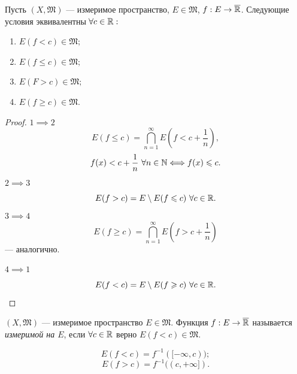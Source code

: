\begin{lemma}
    Пусть $(X, \mathfrak{M})$ — измеримое пространство, $E \in \mathfrak{M}$, $f: E \to \overline{\mathbb{R}}$.
    Следующие условия эквивалентны $\forall c \in \mathbb{R}:$
    \begin{enumerate}
        \item $E(f < c) \in \mathfrak{M};$
        \item $E(f \leqslant c) \in \mathfrak{M};$
        \item $E(F > c) \in \mathfrak{M};$
        \item $E(f \geqslant c) \in \mathfrak{M}.$
    \end{enumerate}
\end{lemma} 
\begin{proof}\tab

    \noindent\underline{$1 \implies 2$}
    \[E(f \leqslant c) = \bigcap\limits_{n=1}^{\infty} E\left(f < c + \frac{1}{n}\right),\]
    \[f(x) < c + \frac{1}{n} \ \forall n \in \mathbb{N} \Longleftrightarrow f(x) \leqslant c.\]
    \underline{$2 \implies 3$}
    \[E(f > c) = E \setminus E(f \leqslant c) \ \forall c \in \mathbb{R}.\]
    \underline{$3 \implies 4$}
    \[E(f \geqslant c) = \bigcap\limits_{n=1}^{\infty} E\left(f > c + \frac{1}{n}\right)\]
    — аналогично.

    \noindent\underline{$4 \implies 1$}
    \[E(f < c) = E \setminus E(f \geqslant c) \ \forall c \in \mathbb{R}.\]
\end{proof} 

\begin{definition}
    $(X, \mathfrak{M})$ — измеримое пространство $E \in \mathfrak{M}$.
    Функция $f: E \to \overline{\mathbb{R}}$ называется \textit{измеримой на $E$}, если $\forall c \in \mathbb{R}$ верно $E(f < c) \in \mathfrak{M}$.
\end{definition} 

\begin{remark}
    \[E(f<c) = f^{-1}([-\infty, c));\]
    \[E(f>c) = f^{-1}((c, +\infty]).\]
\end{remark}

